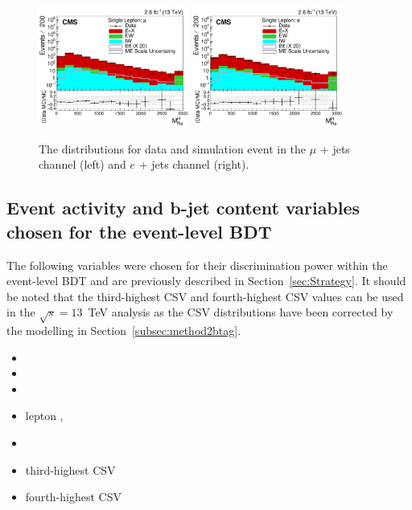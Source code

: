\begin{figure}[ht!]
    \includegraphics[width=0.44\textwidth]{images/Run2/SumJetMassX_StackLogY.pdf}
    \includegraphics[width=0.44\textwidth]{images/Run2/SumJetMassX_StackLogY_e.pdf}
    \caption{ The \redhadmass distributions for data and simulation event in the $\mu$ + jets channel (left) and $e$ + jets channel (right).}
    \label{fig:sumjetmassx13}
\end{figure}


\subsection{Event activity and b-jet content variables chosen for the event-level BDT}
The following variables were chosen for their discrimination power within the event-level BDT and are previously described in Section~\ref{sec:Strategy}. It should be noted that the third-highest CSV and fourth-highest CSV values can be used in the $\sqrt{s} = 13$~TeV analysis as the CSV distributions have been corrected by the modelling in Section~\ref{subsec:method2btag}.


\begin{multicols}{2}
\setlength{\columnseprule}{0pt} 

\begin{itemize}
\item \htb
\item \htrat
\item \njets
\item lepton \pt, \leadleppt
\item \njetsw
\item third-highest CSV
\item fourth-highest CSV
\end{itemize}

\end{multicols}

